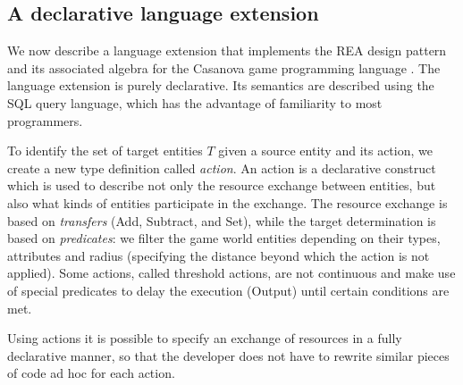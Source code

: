 \subsection{A declarative language extension}

We now describe a language extension that implements the REA design pattern and its associated algebra for the Casanova game programming language \citep{Casanova}. The language extension is purely declarative. Its semantics are described using the SQL query language, which has the advantage of familiarity to most programmers.


To identify the set of target entities $T$ given a source entity and its action, we create a new type definition called \textit{action}. An action is a declarative construct which is used to describe not only the resource exchange between entities, but also what kinds of entities participate in the exchange. The resource exchange is based on \textit{transfers} (Add, Subtract, and Set), while the target determination is based on \textit{predicates}: we filter the game world entities depending on their types, attributes and radius (specifying the distance beyond which the action is not applied). Some actions, called threshold actions, are not continuous and make use of special predicates to delay the execution (Output) until certain conditions are met.

Using actions it is possible to specify an exchange of resources in a fully declarative manner, so that the developer does not have to rewrite similar pieces of code ad hoc for each action. 